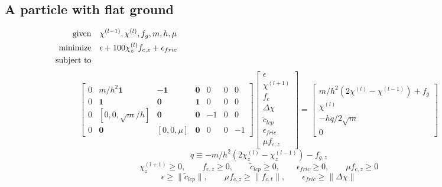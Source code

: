 \documentclass[a4paper,10pt]{article}
\begin{document}
\begin{landscape}
\subsection{A particle with flat ground}
\begin{align}
\text{given}      & \quad \chi^{(l-1)}, \chi^{(l)}, f_g, m, h, \mu\notag\\
\text{minimize}   & \quad \epsilon + 100\chi^{(l)}_z f_{c,z} + \epsilon_{fric} \notag\\
\text{subject to} & \quad\quad\quad\quad\quad\quad\quad\quad\quad\quad\quad\quad\quad\quad\quad
\quad\quad\quad\quad\quad\quad\quad\quad\quad\quad\quad\quad\quad\quad\quad
\quad\quad\quad\quad\quad\quad\quad\quad\quad\quad\quad\quad\quad\quad\quad \notag
\end{align}
\begin{equation}
\left[\begin{array}{ccccccc}
0 & m/h^2\mathbf{1}     & -\mathbf{1}  & \mathbf{0} & 0 & 0 & 0 \\
0 &    \mathbf{1}       & \mathbf{0}   & \mathbf{1} & 0 & 0 & 0 \\
0 & [ 0, 0, \sqrt{m}/h] & \mathbf{0}   & \mathbf{0} & -1 & 0 & 0 \\
0 & \mathbf{0}          & [ 0, 0, \mu] & \mathbf{0} & 0 & 0 & -1
\end{array}\right]
\left[\begin{array}{c}
\epsilon \\ \chi^{(l+1)} \\ f_c \\ \Delta\chi \\ \tilde{c}_{lcp} \\ \epsilon_{fric} \\ \mu f_{c,z}
\end{array}\right]
=
\left[\begin{array}{c}
m/h^2(2\chi^{(l)}-\chi^{(l-1)}) + f_g \\
\chi^{(l)} \\
-hq/2\sqrt{m} \\
0
\end{array}\right]
\end{equation}
\begin{equation}
q \equiv -m/h^2(2\chi^{(l)}_z-\chi^{(l-1)}_z)-f_{g,z}
\end{equation}
\begin{equation}
\chi^{(l+1)}_z \geq 0       , \quad\quad
f_{c,z} \geq 0              , \quad\quad
\tilde{c}_{lcp} \geq 0          , \quad\quad
\epsilon_{fric} \geq 0          , \quad\quad
\mu f_{c,z} \geq 0
\end{equation}
\begin{equation}
\epsilon            \geq \| \tilde{c}_{lcp} \| , \quad\quad
\mu f_{c,z}  \geq \| f_{c,t}         \| , \quad\quad
\epsilon_{fric}    \geq \| \Delta\chi      \|
\end{equation}
\end{landscape}
\end{document}
